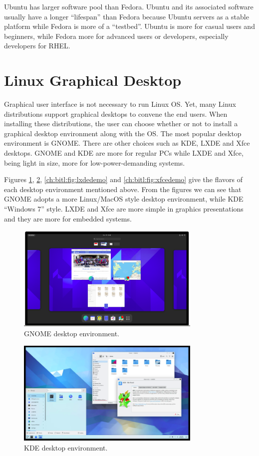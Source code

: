Ubuntu has larger software pool than Fedora. Ubuntu and its associated software usually have a longer ``lifespan'' than Fedora because Ubuntu servers as a stable platform while Fedora is more of a ``testbed''. Ubuntu is more for casual users and beginners, while Fedora more for advanced users or developers, especially developers for RHEL.

\section{Linux Graphical Desktop}

Graphical user interface is not necessary to run Linux OS. Yet, many Linux distributions support graphical desktops to convene the end users. When installing these distributions, the user can choose whether or not to install a graphical desktop environment along with the OS. The most popular desktop environment is GNOME. There are other choices such as KDE, LXDE and Xfce desktops. GNOME and KDE are more for regular PCs while LXDE and Xfce, being light in size, more for low-power-demanding systems.

Figures \ref{ch:bitl:fig:gnomedemo}, \ref{ch:bitl:fig:kdedemo}, \ref{ch:bitl:fig:lxdedemo} and \ref{ch:bitl:fig:xfcedemo} give the flavors of each desktop environment mentioned above. From the figures we can see that GNOME adopts a more Linux/MacOS style desktop environment, while KDE ``Windows 7'' style. LXDE and Xfce are more simple in graphics presentations and they are more for embedded systems.

\begin{figure}[htbp]
	\centering
	\includegraphics[width=250pt]{chapters/ch-brief-introduction-to-linux/figures/gnome_demo.png}
	\caption{GNOME desktop environment.} \label{ch:bitl:fig:gnomedemo}
\end{figure}

\begin{figure}[htbp]
	\centering
	\includegraphics[width=250pt]{chapters/ch-brief-introduction-to-linux/figures/kde_demo.png}
	\caption{KDE desktop environment.} \label{ch:bitl:fig:kdedemo}
\end{figure}

